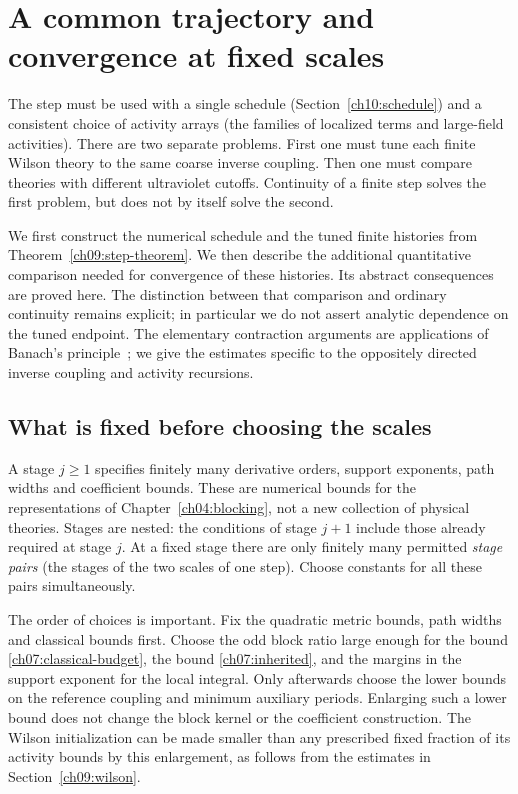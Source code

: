 \chapter[Common trajectories and convergence]{A common trajectory and convergence at fixed scales}
\label{ch10:trajectory}

The step must be used with a single schedule (Section~\ref{ch10:schedule})
and a consistent choice of activity arrays (the families of localized terms and large-field activities). There are two
separate problems. First one must tune each finite Wilson theory to the
same coarse inverse coupling. Then one must compare theories with different
ultraviolet cutoffs. Continuity of a finite step solves the first
problem, but does not by itself solve the second.

We first construct the numerical schedule and the tuned finite
histories from Theorem~\ref{ch09:step-theorem}. We then describe the
additional quantitative comparison needed for convergence of these
histories. Its abstract consequences are proved here. The distinction
between that comparison and ordinary continuity remains explicit;
in particular we do not assert analytic dependence on the tuned
endpoint. The elementary contraction arguments are applications of
Banach's principle~\cite{Banach1922}; we give the estimates specific to
the oppositely directed inverse coupling and activity recursions.

\section{What is fixed before choosing the scales}
\label{ch10:choices}

A stage $j\ge1$ specifies finitely many derivative orders, support
exponents, path widths and coefficient bounds. These are numerical
bounds for the representations of Chapter~\ref{ch04:blocking}, not a
new collection of physical theories. Stages are nested: the conditions
of stage $j+1$ include those already required at stage $j$. At a fixed
stage there are only finitely many permitted \emph{stage pairs} (the stages of the two scales of one step). Choose
constants for all these pairs simultaneously.

The order of choices is important. Fix the quadratic metric bounds,
path widths and classical bounds first. Choose the odd block ratio
large enough for the bound
\eqref{ch07:classical-budget}, the bound
\eqref{ch07:inherited}, and the margins in the support exponent for the local integral.
Only afterwards choose the lower bounds on the reference coupling and minimum auxiliary
periods. Enlarging such a lower bound does not change the block
kernel or the coefficient construction. The Wilson initialization can
be made smaller than any prescribed fixed fraction of its activity
bounds by this enlargement, as follows from the estimates in
Section~\ref{ch09:wilson}.

